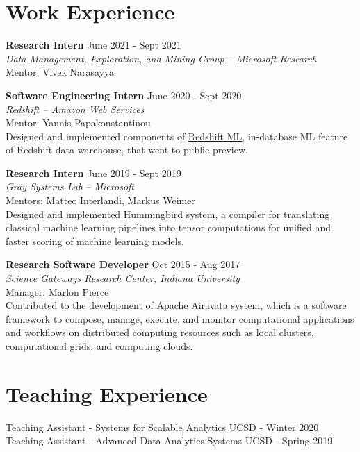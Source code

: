 \documentclass[margin]{res}
\begin{document}
\begin{resume}
\vspace{-4mm}
\section{Work Experience}

\textbf{Research Intern}
\hfill June 2021 - Sept 2021 \\
\textit{Data Management, Exploration, and Mining Group -- Microsoft Research} \\
Mentor: Vivek Narasayya

\textbf{Software Engineering Intern}
\hfill June 2020 - Sept 2020 \\
\textit{Redshift -- Amazon Web Services} \\
Mentor: Yannis Papakonstantinou\\
Designed and implemented components of \href{https://aws.amazon.com/redshift/features/redshift-ml/}{Redshift ML}, in-database ML feature of Redshift data warehouse, that went to public preview.

\textbf{Research Intern}
\hfill June 2019 - Sept 2019 \\
\textit{Gray Systems Lab -- Microsoft} \\
Mentors: Matteo Interlandi, Markus Weimer\\
Designed and implemented \href{https://github.com/microsoft/hummingbird}{Hummingbird} system, a compiler for translating classical machine learning pipelines into tensor computations for unified and faster scoring of machine learning models.

\textbf{Research Software Developer}
\hfill Oct 2015 - Aug 2017 \\
\textit{Science Gateways Research Center, Indiana University} \\
Manager: Marlon Pierce\\
Contributed to the development of \href{https://airavata.apache.org/index.html}{Apache Airavata} system, which is a software framework to compose, manage, execute, and monitor computational applications and workflows on distributed computing resources such as local clusters, computational grids, and computing clouds.


\section{Teaching Experience}
Teaching Assistant - Systems for Scalable Analytics \hfill UCSD - Winter 2020\\
Teaching Assistant - Advanced Data Analytics Systems \hfill UCSD - Spring 2019



\end{resume}
\end{document}
